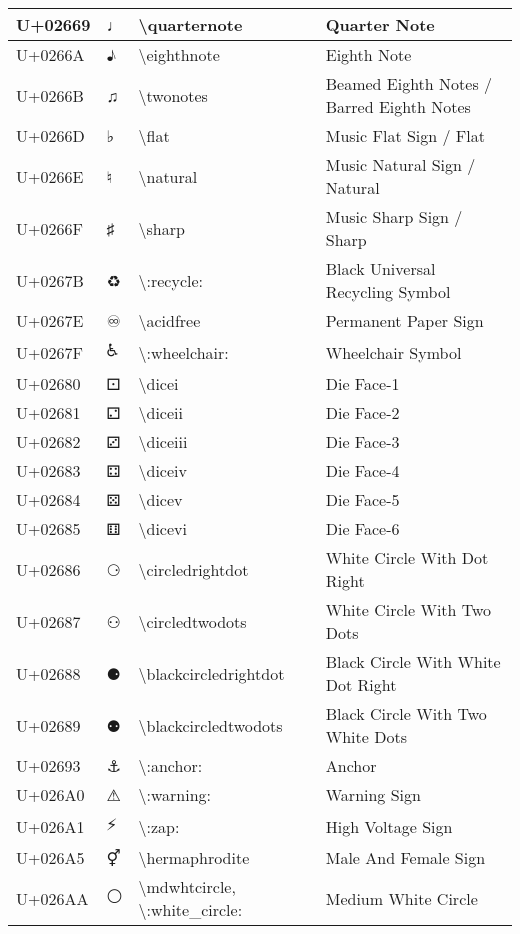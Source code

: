 \begin{table}[h]
\begin{tabulary}{\linewidth}{|L|L|L|L|}
\hline
U+02669 & ♩ & {\textbackslash}quarternote & Quarter Note \\
\hline
U+0266A & ♪ & {\textbackslash}eighthnote & Eighth Note \\
\hline
U+0266B & ♫ & {\textbackslash}twonotes & Beamed Eighth Notes / Barred Eighth Notes \\
\hline
U+0266D & ♭ & {\textbackslash}flat & Music Flat Sign / Flat \\
\hline
U+0266E & ♮ & {\textbackslash}natural & Music Natural Sign / Natural \\
\hline
U+0266F & ♯ & {\textbackslash}sharp & Music Sharp Sign / Sharp \\
\hline
U+0267B & ♻ & {\textbackslash}:recycle: & Black Universal Recycling Symbol \\
\hline
U+0267E & ♾ & {\textbackslash}acidfree & Permanent Paper Sign \\
\hline
U+0267F & ♿ & {\textbackslash}:wheelchair: & Wheelchair Symbol \\
\hline
U+02680 & ⚀ & {\textbackslash}dicei & Die Face-1 \\
\hline
U+02681 & ⚁ & {\textbackslash}diceii & Die Face-2 \\
\hline
U+02682 & ⚂ & {\textbackslash}diceiii & Die Face-3 \\
\hline
U+02683 & ⚃ & {\textbackslash}diceiv & Die Face-4 \\
\hline
U+02684 & ⚄ & {\textbackslash}dicev & Die Face-5 \\
\hline
U+02685 & ⚅ & {\textbackslash}dicevi & Die Face-6 \\
\hline
U+02686 & ⚆ & {\textbackslash}circledrightdot & White Circle With Dot Right \\
\hline
U+02687 & ⚇ & {\textbackslash}circledtwodots & White Circle With Two Dots \\
\hline
U+02688 & ⚈ & {\textbackslash}blackcircledrightdot & Black Circle With White Dot Right \\
\hline
U+02689 & ⚉ & {\textbackslash}blackcircledtwodots & Black Circle With Two White Dots \\
\hline
U+02693 & ⚓ & {\textbackslash}:anchor: & Anchor \\
\hline
U+026A0 & ⚠ & {\textbackslash}:warning: & Warning Sign \\
\hline
U+026A1 & ⚡ & {\textbackslash}:zap: & High Voltage Sign \\
\hline
U+026A5 & ⚥ & {\textbackslash}hermaphrodite & Male And Female Sign \\
\hline
U+026AA & ⚪ & {\textbackslash}mdwhtcircle, {\textbackslash}:white\_circle: & Medium White Circle \\

\end{tabulary}
\end{table}
